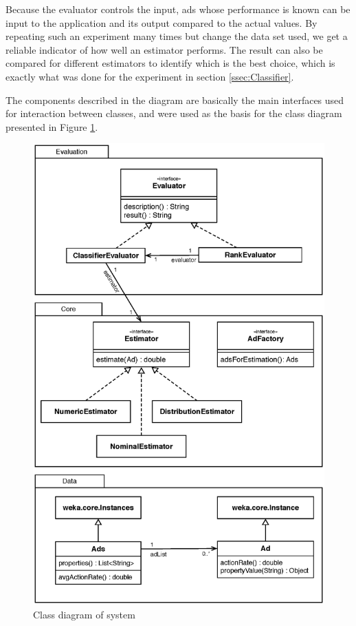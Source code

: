 \documentclass{sig-alternate}
\begin{document}
Because the evaluator controls the input, ads whose performance is known can be input to the application and its output compared to the actual values. By repeating such an experiment many times but change the data set used, we get a reliable indicator of how well an estimator performs. The result can also be compared for different estimators to identify which is the best choice, which is exactly what was done for the experiment in section \ref{ssec:Classifier}.

The components described in the diagram are basically the main interfaces used for interaction between classes, and were used as the basis for the class diagram presented in Figure \ref{fig:ClassDiagram}.

\begin{figure}[htb]
	\centering
	\includegraphics[width=\columnwidth]{class-diagram.eps}
	\caption{Class diagram of system}
	\label{fig:ClassDiagram}
\end{figure}
\end{document}
